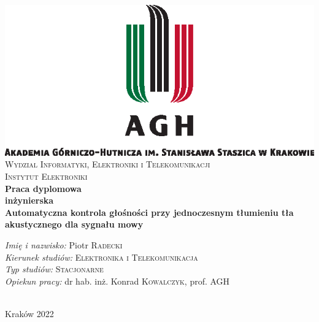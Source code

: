 \begin{titlepage}

\begin{center}

\includegraphics[scale=1.25]{agh_nzw_s_pl_1w_wbr_pms}\\[0.2cm]

\textsc{Wydzial Informatyki, Elektroniki i Telekomunikacji}\\[0.2cm]

\textsc{Instytut Elektroniki}\\[1cm]

\textbf{Praca dyplomowa \\ inżynierska}\\[1cm]

{\huge \bfseries Automatyczna kontrola głośności przy jednoczesnym tłumieniu tła akustycznego dla sygnału mowy}\\[1cm]



\vfill

\begin{minipage}{0.8\textwidth}
\begin{flushleft}
{\large \emph{Imię i nazwisko:} \hfill Piotr \textsc{Radecki}}\\[0.1cm]
{\large \emph{Kierunek studiów:} \hfill \textsc{Elektronika i Telekomunikacja}}\\[0.1cm]
{\large \emph{Typ studiów:} \hfill \textsc{Stacjonarne}}\\[0.1cm]
{\large \emph{Opiekun pracy:} \hfill dr hab. inż. Konrad \textsc{Kowalczyk}, prof. AGH}\\[0.1cm]
\end{flushleft}
\end{minipage}\\[2cm]

Kraków 2022

\end{center}

\end{titlepage}
